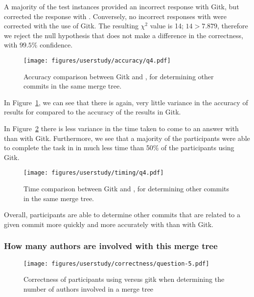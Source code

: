 A majority of the test instances provided an incorrect response with
Gitk, but corrected the response with \tool. Conversely, no incorrect
responses with \tool were corrected with the use of Gitk. The resulting
$\chi^2$ value is 14; $14 > 7.879$, therefore we reject the null
hypothesis that \tool does not make a difference in the correctness,
with $99.5\%$ confidence.

\begin{figure}[htpb]
  \centering
  \texttt{[image: figures/userstudy/accuracy/q4.pdf]}
  \caption{Accuracy comparison between Gitk and \tool, for determining
    other commits in the same merge tree.}
  \label{fig:q4_accuracy}
\end{figure}

In Figure~\ref{fig:q4_accuracy}, we can see that there is again, very
little variance in the accuracy of results for \tool compared to the
accuracy of the results in Gitk.

In Figure~\ref{fig:q4_timing} there is less variance in the time taken
to come to an answer with \tool than with Gitk. Furthermore, we see that
a majority of the participants were able to complete the task in \tool
in much less time than 50\% of the participants using Gitk.

\begin{figure}[htpb]
  \centering
  \texttt{[image: figures/userstudy/timing/q4.pdf]}
  \caption{Time comparison between Gitk and \tool, for determining
    other commits in the same merge tree.}
  \label{fig:q4_timing}
\end{figure}

Overall, participants are able to determine other commits that are
related to a given commit more quickly and more accurately with \tool
than with Gitk.

\subsubsection{How many authors are involved with this merge tree}
\label{ssub:how_many_authors_are_involved_with_this_merge_tree}

\begin{figure}[htpb]
  \centering
  \texttt{[image: figures/userstudy/correctness/question-5.pdf]}
  \caption{Correctness of participants using \tool versus gitk when
    determining the number of authors involved in a merge tree}
  \label{fig:q_5_correctness}
\end{figure}

